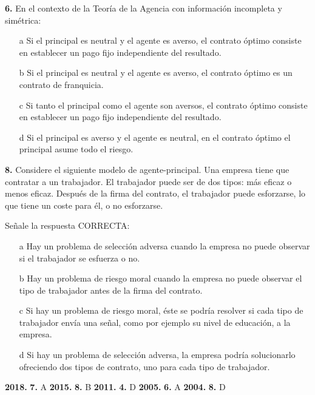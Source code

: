 \documentclass{nuevotema}
\begin{document}
\textbf{6.} En el contexto de la Teoría de la Agencia con información incompleta y simétrica:

\begin{itemize}
	\item[a] Si el principal es neutral y el agente es averso, el contrato óptimo consiste en establecer un pago fijo independiente del resultado.
	\item[b] Si el principal es neutral y el agente es averso, el contrato óptimo es un contrato de franquicia.
	\item[c] Si tanto el principal como el agente son aversos, el contrato óptimo consiste en establecer un pago fijo independiente del resultado.
	\item[d] Si el principal es averso y el agente es neutral, en el contrato óptimo el principal asume todo el riesgo.
\end{itemize}


\textbf{8.} Considere el siguiente modelo de agente-principal. Una empresa tiene que contratar a un trabajador. El trabajador puede ser de dos tipos: más eficaz o menos eficaz. Después de la firma del contrato, el trabajador puede esforzarse, lo que tiene un coste para él, o no esforzarse.

Señale la respuesta CORRECTA:

\begin{itemize}
	\item[a] Hay un problema de selección adversa cuando la empresa no puede observar si el trabajador se esfuerza o no.
	\item[b] Hay un problema de riesgo moral cuando la empresa no puede observar el tipo de trabajador antes de la firma del contrato.
	\item[c] Si hay un problema de riesgo moral, éste se podría resolver si cada tipo de trabajador envía una señal, como por ejemplo su nivel de educación, a la empresa.
	\item[d] Si hay un problema de selección adversa, la empresa podría solucionarlo ofreciendo dos tipos de contrato, uno para cada tipo de trabajador.
\end{itemize}

\notas

\textbf{2018.} \textbf{7.} A
\textbf{2015.} \textbf{8.} B
\textbf{2011.} \textbf{4.} D
\textbf{2005.} \textbf{6.} A
\textbf{2004.} \textbf{8.} D

\bibliografia
\end{document}
